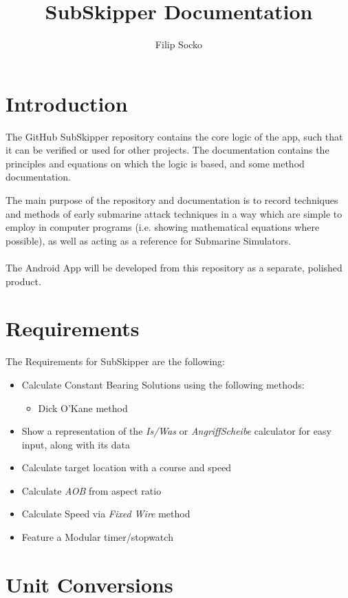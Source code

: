 \documentclass{article}
\author{Filip Socko}
\title{SubSkipper Documentation}
\begin{document}
\maketitle

\section{Introduction}
The GitHub SubSkipper repository contains the core logic of the app, such that it can be verified or used for other projects. The documentation contains the principles and equations on which the logic is based, and some method documentation.

The main purpose of the repository and documentation is to record techniques and methods of early submarine attack techniques in a way which are simple to employ in computer programs (i.e. showing mathematical equations where possible), as well as acting as a reference for Submarine Simulators.
\\ \\
The Android App will be developed from this repository as a separate, polished product.

\section{Requirements}
The Requirements for SubSkipper are the following:

\begin{itemize}
\item{Calculate Constant Bearing Solutions using the following methods:}
	\begin{itemize}
	\item{Dick O'Kane method}
	\end{itemize}
\item{Show a representation of the \emph{Is/Was} or \emph{AngriffScheibe} calculator for easy input, along with its data}
\item{Calculate target location with a course and speed}
\item{Calculate \emph{AOB} from aspect ratio}
\item{Calculate Speed via \emph{Fixed Wire} method}
\item{Feature a Modular timer/stopwatch}
\end{itemize}

\pagebreak
\section{Unit Conversions}
\end{document}
